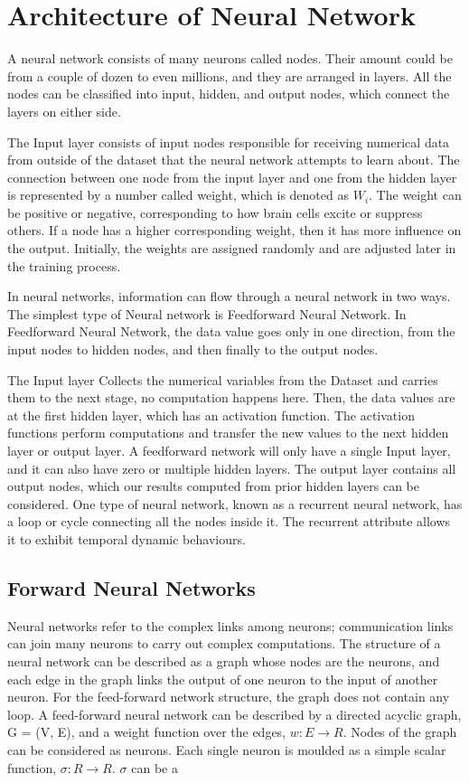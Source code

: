 \section{Architecture of Neural Network}
A neural network consists of many neurons called nodes. Their amount could be from a couple of dozen to even millions, and they are arranged in layers. All the nodes can be classified into input, hidden, and output nodes, which connect the layers on either side. 


The Input layer consists of input nodes responsible for receiving numerical data from outside of the dataset that the neural network attempts to learn about. The connection between one node from the input layer and one from the hidden layer is represented by a number called weight, which is denoted as $W_{i}$. The weight can be positive or negative, corresponding to how brain cells excite or suppress others. If a node has a higher corresponding weight, then it has more influence on the output. Initially, the weights are assigned randomly and are adjusted later in the training process.

In neural networks, information can flow through a neural network in two ways. The simplest type of Neural network is Feedforward Neural Network. In Feedforward Neural Network, the data value goes only in one direction, from the input nodes to hidden nodes, and then finally to the output nodes.

The Input layer Collects the numerical variables from the Dataset and carries them to the next stage, no computation happens here. Then, the data values are at the first hidden layer, which has an activation function. The activation functions perform computations and transfer the new values to the next hidden layer or output layer. A feedforward network will only have a single Input layer, and it can also have zero or multiple hidden layers.
The output layer contains all output nodes, which our results computed from prior hidden layers can be considered. One type of neural network, known as a recurrent neural network, has a loop or cycle connecting all the nodes inside it. The recurrent attribute allows it to exhibit temporal dynamic behaviours.


\subsection{Forward Neural Networks}
Neural networks refer to the complex links among neurons; communication links can join many neurons to carry out complex computations. The structure of a neural network can be described as a graph whose nodes are the neurons, and each edge in the graph links the output of one neuron to the input of another neuron. For the feed-forward network structure, the graph does not contain any loop.
A feed-forward neural network can be described by a directed acyclic graph, G = (V, E), and a weight function over the edges, $w: E\xrightarrow{}R$. Nodes of the graph can be considered as neurons. Each single neuron is moulded as a simple scalar function, $\sigma: R\xrightarrow[]{}R$.
$\sigma$ can be a 

